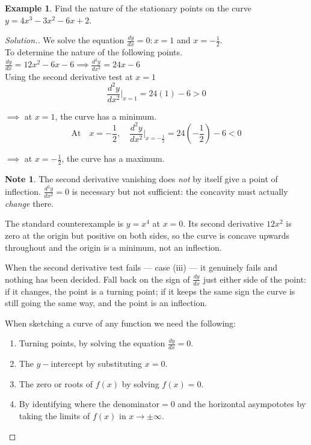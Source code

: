 \documentclass[11pt,a4paper]{article}
\theoremstyle{definition}
\newtheorem{example}[thm]{Example}
\newtheorem{note}[thm]{Note}
\newenvironment{solution}
  {\renewcommand{\qedsymbol}{}\begin{proof}[\textit{Solution}.]}
  {\end{proof}}
\begin{document}
\begin{example}

Find the nature of the stationary points on the curve $y=4x^{3}-3x^{2}-6x+2$.
\end{example}
\begin{solution}

We solve the equation $\frac{dy}{dx}=0:x=1$ and $x=-\frac{1}{2}$.\\
To determine the nature of the following points.\\

$\frac{dy}{dx}=12x^2-6x-6\implies \frac{d^2y}{dx^2}=24x-6$\\


Using the second derivative test at $x=1$
$$\frac{d^2y}{dx^2}\Bigg|_{x=1}=24(1)-6>0$$

$\implies$ at $x=1$, the curve has a minimum.\\


$$\text{At}\quad  x=-\frac{1}{2},\quad  \frac{d^2y}{dx^2}\Bigg|_{x=-\frac{1}{2}}=24\left(-\frac{1}{2}\right)-6<0$$

$\implies$ at $x=-\frac{1}{2}$, the curve has a maximum.\\

\begin{note}
The second derivative vanishing does \emph{not} by itself give a point of
inflection. $\frac{d^{2}y}{dx^{2}}=0$ is necessary but not sufficient: the
concavity must actually \emph{change} there.

The standard counterexample is $y=x^{4}$ at $x=0$. Its second derivative $12x^{2}$
is zero at the origin but positive on both sides, so the curve is concave upwards
throughout and the origin is a minimum, not an inflection.

When the second derivative test fails --- case (iii) --- it genuinely fails and
nothing has been decided. Fall back on the sign of $\frac{dy}{dx}$ just either side
of the point: if it changes, the point is a turning point; if it keeps the same
sign the curve is still going the same way, and the point is an inflection.
\end{note}



When sketching a curve of any function we need the following:\\
\begin{enumerate}
\item Turning points, by solving the equation $\frac{dy}{dx}=0$.
\item The $y-$intercept by substituting $x=0$.
\item The zero or roots of $f(x)$ by solving $f(x)=0$.
\item By identifying where the denominator$=0$ and the horizontal asympototes by taking the limits of $f(x)$ in $x\longrightarrow \pm \infty$.\\
\end{enumerate}
\end{solution}
\end{document}
